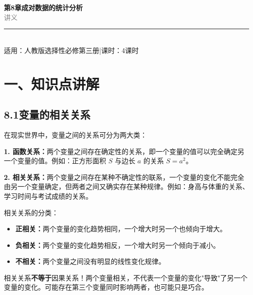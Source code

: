 \documentclass[12pt, a4paper]{ctexart}
\begin{document}
\begin{center}
{\Huge\bfseries\textcolor{mainblue}{第8章\quad 成对数据的统计分析}}\\[12pt]
{\Large\textcolor{gray}{讲\quad 义}}\\[8pt]
\rule{0.6\textwidth}{1pt}\\[8pt]
{\normalsize 适用：人教版\quad 选择性必修第三册\quad |\quad 课时：4课时}
\end{center}
\vspace{10pt}

\section*{\textcolor{mainblue}{一、知识点讲解}}

\subsection*{8.1\quad 变量的相关关系}

\begin{knowledgebox}[变量的相关关系]
在现实世界中，变量之间的关系可分为两大类：

\medskip
\textbf{1. 函数关系：}两个变量之间存在确定性的关系，即一个变量的值可以完全确定另一个变量的值。例如：正方形面积 $S$ 与边长 $a$ 的关系 $S=a^2$。

\medskip
\textbf{2. 相关关系：}两个变量之间存在某种不确定性的联系，一个变量的变化不能完全由另一个变量确定，但两者之间又确实存在某种规律。例如：身高与体重的关系、学习时间与考试成绩的关系。

\medskip
相关关系的分类：
\begin{itemize}[leftmargin=2em]
  \item \textbf{正相关：}两个变量的变化趋势相同，一个增大时另一个也倾向于增大。
  \item \textbf{负相关：}两个变量的变化趋势相反，一个增大时另一个倾向于减小。
  \item \textbf{不相关：}两个变量之间没有明显的线性变化规律。
\end{itemize}
\end{knowledgebox}

\begin{warnbox}[易错提醒]
相关关系\textbf{不等于}因果关系！两个变量相关，不代表一个变量的变化"导致"了另一个变量的变化。可能存在第三个变量同时影响两者，也可能只是巧合。
\end{warnbox}
\end{document}
